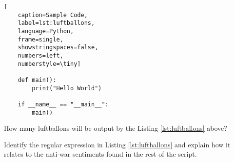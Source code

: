 \documentclass[11pt,letterpaper]{article}
\begin{document}
\begin{question}

  \begin{lstlisting}[
    caption=Sample Code,
    label=lst:luftballons,
    language=Python,
    frame=single,
    showstringspaces=false,
    numbers=left,
    numberstyle=\tiny]

    def main():
        print("Hello World")

    if __name__ == "__main__":
        main()

    \end{lstlisting}


    \begin{subquestion}{How many luftballons will be output by the Listing \ref{lst:luftballons} above?} %


    \end{subquestion}


    \begin{subquestion}{Identify the regular expression in Listing \ref{lst:luftballons} and explain how it relates to the anti-war sentiments found in the rest of the script.} %


    \end{subquestion}


  \end{question}

  \newpage
  
  

  
\end{document}
